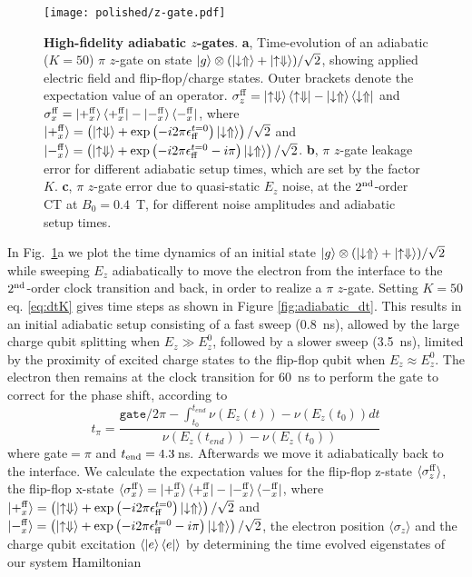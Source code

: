 \begin{figure}[h]
	\centering
	\texttt{[image: polished/z-gate.pdf]}
	\caption[High-fidelity adiabatic $z$-gates]{\textbf{High-fidelity adiabatic $z$-gates}.
		\textbf{a}, Time-evolution of an adiabatic  ($K=50$) $\pi$ $z$-gate on state $\ket{g}\otimes(\ket{\downarrow\Uparrow}+\ket{\uparrow\Downarrow})/\sqrt{2}$, showing applied electric field and flip-flop/charge states. Outer brackets denote the expectation value of an operator. $\sigma_z^{\rm ff}=\ket{\uparrow\Downarrow}\bra{\uparrow\Downarrow}-\ket{\downarrow\Uparrow}\bra{\downarrow\Uparrow}$ and $\sigma_x^{\rm ff}=\ket{+_x^{\rm ff}}\bra{+_x^{\rm ff}}-\ket{-_x^{\rm ff}}\bra{-_x^{\rm ff}}$, where $\ket{+_x^{\rm ff}}=\left(\ket{\uparrow\Downarrow}+\exp{\left(-i2\pi\epsilon_{\rm ff}^{t=0}\right)}\ket{\downarrow\Uparrow}\right)/\sqrt{2}$ and $\ket{-_x^{\rm ff}}=\left(\ket{\uparrow\Downarrow}+\exp{\left(-i2\pi\epsilon_{\rm ff}^{t=0}-i\pi\right)}\ket{\downarrow\Uparrow}\right)/\sqrt{2}$. 
		\textbf{b}, $\pi$ $z$-gate leakage error for different adiabatic setup times, which are set by the factor $K$.
		\textbf{c}, $\pi$ $z$-gate error due to quasi-static $E_z$ noise, at the $2^{\rm nd}$-order CT at $B_0=0.4$~T, for different noise amplitudes and adiabatic setup times.}
	\label{fig:z-gate}
\end{figure}

In Fig.~\ref{fig:z-gate}a we plot the time dynamics of an initial state $\ket{g}\otimes(\ket{\downarrow\Uparrow}+\ket{\uparrow\Downarrow})/\sqrt{2}$ while sweeping $E_z$ adiabatically to move the electron from the interface to the $2^{\rm nd}$-order clock transition and back, in order to realize a $\pi$ $z$-gate. Setting $K=50$ eq. \eqref{eq:dtK} gives time steps as shown in Figure \ref{fig:adiabatic_dt}. This results in an initial adiabatic setup consisting of a fast sweep (0.8~ns), allowed by the large charge qubit splitting when $E_z \gg E_z^0$, followed by a slower sweep (3.5~ns), limited by the proximity of excited charge states to the flip-flop qubit when $E_z \approx E_z^0$. The electron then remains at the clock transition for 60~ns to perform the gate to correct for the phase shift, according to 
\begin{equation}
t_{\pi}=\frac{\texttt{gate}/2\pi-\int_{t_0}^{t_{end}} \nu(E_z(t))-\nu(E_z(t_0))dt}{\nu (E_z(t_{end}))-\nu(E_z(t_0))}
\end{equation} 
where gate$=\pi$ and $t_{\rm end}=4.3\,$ns. Afterwards we move it adiabatically back to the interface. We calculate the expectation values for the flip-flop z-state $\langle \sigma_z^{\rm ff}\rangle$, the flip-flop x-state $\langle \sigma_x^{\rm ff}\rangle=\ket{+_x^{\rm ff}}\bra{+_x^{\rm ff}}-\ket{-_x^{\rm ff}}\bra{-_x^{\rm ff}}$, where $\ket{+_x^{\rm ff}}=\left(\ket{\uparrow\Downarrow}+\exp{\left(-i2\pi\epsilon_{\rm ff}^{t=0}\right)}\ket{\downarrow\Uparrow}\right)/\sqrt{2}$ and $\ket{-_x^{\rm ff}}=\left(\ket{\uparrow\Downarrow}+\exp{\left(-i2\pi\epsilon_{\rm ff}^{t=0}-i\pi\right)}\ket{\downarrow\Uparrow}\right)/\sqrt{2}$, the electron position $\langle \sigma_z\rangle$ and the charge qubit excitation $\langle \ket{e}\bra{e}\rangle$ by determining the time evolved eigenstates of our system Hamiltonian 

